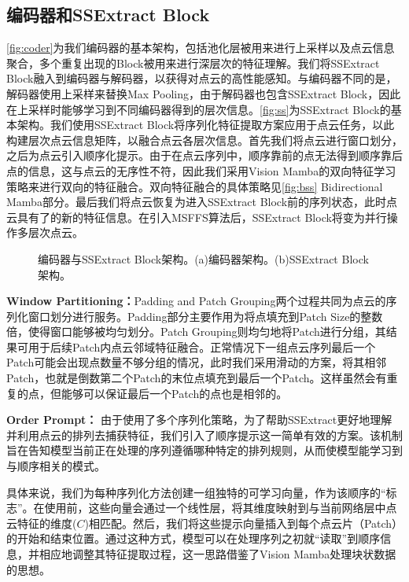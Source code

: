 \documentclass[preprint,12pt]{elsarticle}
\begin{document}
\subsection{编码器和SSExtract Block}
\cref{fig:coder}为我们编码器的基本架构，包括池化层被用来进行上采样以及点云信息聚合，多个重复出现的Block被用来进行深层次的特征理解。我们将SSExtract Block融入到编码器与解码器，以获得对点云的高性能感知。与编码器不同的是，解码器使用上采样来替换Max Pooling，由于解码器也包含SSExtract Block，因此在上采样时能够学习到不同编码器得到的层次信息。\cref{fig:ss}为SSExtract Block的基本架构。我们使用SSExtract Block将序列化特征提取方案应用于点云任务，以此构建层次点云信息矩阵，以融合点云各层次信息。首先我们将点云进行窗口划分，之后为点云引入顺序化提示。由于在点云序列中，顺序靠前的点无法得到顺序靠后点的信息，这与点云的无序性不符，因此我们采用Vision Mamba\cite{VisionMamba}的双向特征学习策略来进行双向的特征融合。双向特征融合的具体策略见\cref{fig:bss} Bidirectional Mamba部分。最后我们将点云恢复为进入SSExtract Block前的序列状态，此时点云具有了的新的特征信息。在引入MSFFS算法后，SSExtract Block将变为并行操作多层次点云。

\begin{figure}[htbp]
	\centering 	

	\caption{编码器与SSExtract Block架构。(a)编码器架构。(b)SSExtract Block架构。} 
\end{figure}



\textbf{Window Partitioning：}Padding and Patch Grouping两个过程共同为点云的序列化窗口划分进行服务。Padding部分主要作用为将点填充到Patch Size的整数倍，使得窗口能够被均匀划分。Patch Grouping则均匀地将Patch进行分组，其结果可用于后续Patch内点云邻域特征融合。正常情况下一组点云序列最后一个Patch可能会出现点数量不够分组的情况，此时我们采用滑动的方案，将其相邻Patch，也就是倒数第二个Patch的末位点填充到最后一个Patch。这样虽然会有重复的点，但能够可以保证最后一个Patch的点也是相邻的。

\textbf{Order Prompt：}
由于使用了多个序列化策略，为了帮助SSExtract更好地理解并利用点云的排列去捕获特征，我们引入了顺序提示这一简单有效的方案。该机制旨在告知模型当前正在处理的序列遵循哪种特定的排列规则，从而使模型能学习到与顺序相关的模式。

具体来说，我们为每种序列化方法创建一组独特的可学习向量，作为该顺序的“标志”。在使用前，这些向量会通过一个线性层，将其维度映射到与当前网络层中点云特征的维度($C$)相匹配。然后，我们将这些提示向量插入到每个点云片（Patch）的开始和结束位置。通过这种方式，模型可以在处理序列之初就“读取”到顺序信息，并相应地调整其特征提取过程，这一思路借鉴了Vision Mamba\cite{VisionMamba}处理块状数据的思想。
\end{document}
